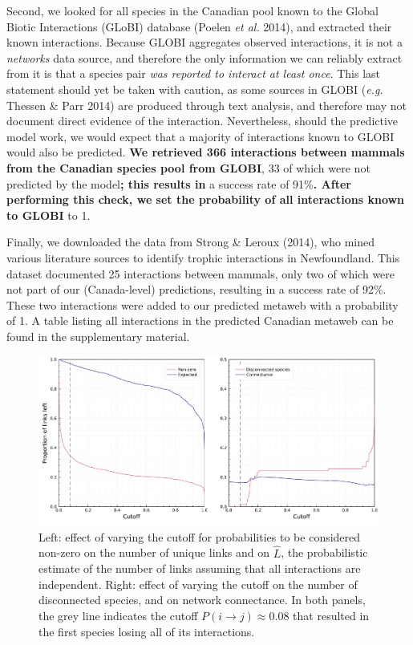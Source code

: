 \documentclass[11pt]{article}
\makeatletter
\def\maxwidth{\ifdim\Gin@nat@width>\linewidth\linewidth
\else\Gin@nat@width\fi}
\let\Oldincludegraphics\includegraphics
\renewcommand{\includegraphics}[1]{\Oldincludegraphics[width=\maxwidth]{#1}}
\providecommand{\DIFaddtex}[1]{{\bf #1}} %
\providecommand{\DIFdeltex}[1]{} %
\providecommand{\DIFaddbegin}{\protect\color{blue}} %
\providecommand{\DIFaddend}{\protect\color{black}} %
\providecommand{\DIFdelbegin}{\protect\color{red}} %
\providecommand{\DIFdelend}{\protect\color{black}} %
\providecommand{\DIFadd}[1]{\texorpdfstring{\DIFaddtex{#1}}{#1}} %
\providecommand{\DIFdel}[1]{\texorpdfstring{\DIFdeltex{#1}}{}} %
\newcommand{\DIFscaledelfig}{0.5}
\newlength{\DIFdelgraphicswidth} %
\newlength{\DIFdelgraphicsheight} %
\newcommand{\DIFaddincludegraphics}[2][]{{\color{blue}\fbox{\DIFOincludegraphics[#1]{#2}}}} %
\newcommand{\DIFdelincludegraphics}[2][]{%
\sbox{\DIFdelgraphicsbox}{\DIFOincludegraphics[#1]{#2}}%
\settoboxwidth{\DIFdelgraphicswidth}{\DIFdelgraphicsbox} %
\settoboxtotalheight{\DIFdelgraphicsheight}{\DIFdelgraphicsbox} %
\scalebox{\DIFscaledelfig}{%
\parbox[b]{\DIFdelgraphicswidth}{\usebox{\DIFdelgraphicsbox}\\[-\baselineskip] \rule{\DIFdelgraphicswidth}{0em}}\llap{\resizebox{\DIFdelgraphicswidth}{\DIFdelgraphicsheight}{%
\setlength{\unitlength}{\DIFdelgraphicswidth}%
\begin{picture}(1,1)%
\thicklines\linethickness{2pt} %
{\color[rgb]{1,0,0}\put(0,0){\framebox(1,1){}}}%
{\color[rgb]{1,0,0}\put(0,0){\line( 1,1){1}}}%
{\color[rgb]{1,0,0}\put(0,1){\line(1,-1){1}}}%
\end{picture}%
}\hspace*{3pt}}} %
} %
\DeclareRobustCommand{\DIFaddbegin}{\DIFOaddbegin \let\includegraphics\DIFaddincludegraphics} %
\DeclareRobustCommand{\DIFaddend}{\DIFOaddend \let\includegraphics\DIFOincludegraphics} %
\DeclareRobustCommand{\DIFdelbegin}{\DIFOdelbegin \let\includegraphics\DIFdelincludegraphics} %
\DeclareRobustCommand{\DIFdelend}{\DIFOaddend \let\includegraphics\DIFOincludegraphics} %
\makeatother
\begin{document}
Second, we looked for all species in the Canadian pool known to the
Global Biotic Interactions (GLoBI) database (Poelen \emph{et al.} 2014),
and extracted their known interactions. Because GLOBI aggregates
observed interactions, it is not a \emph{networks} data source, and
therefore the only information we can reliably extract from it is that a
species pair \emph{was reported to interact at least once}. This last
statement should yet be taken with caution, as some sources in GLOBI
(\emph{e.g.} Thessen \& Parr 2014) are produced through text analysis,
and therefore may not document direct evidence of the interaction.
Nevertheless, should the predictive model work, we would expect that a
majority of interactions known to GLOBI would also be predicted. \DIFdelbegin \DIFdel{After
performing this check, we set the probability of all interactions known
to GLOBI(366 in total}\DIFdelend \DIFaddbegin \DIFadd{We
retrieved 366 interactions between mammals from the Canadian species
pool from GLOBI}\DIFaddend , 33 of which were not predicted by the model\DIFdelbegin \DIFdel{, for
}\DIFdelend \DIFaddbegin \DIFadd{; this
results in }\DIFaddend a success rate of 91\%\DIFdelbegin \DIFdel{) }\DIFdelend \DIFaddbegin \DIFadd{. After performing this check, we set
the probability of all interactions known to GLOBI }\DIFaddend to 1.

Finally, we downloaded the data from Strong \& Leroux (2014), who mined
various literature sources to identify trophic interactions in
Newfoundland. This dataset documented 25 interactions between mammals,
only two of which were not part of our (Canada-level) predictions,
resulting in a success rate of 92\%. These two interactions were added
to our predicted metaweb with a probability of 1. A table listing all
interactions in the predicted Canadian metaweb can be found in the
supplementary material.

\begin{figure}
\hypertarget{fig:thresholds}{%
\centering
\includegraphics{figures/figure-cutoffs.png}
\caption{Left: effect of varying the cutoff for probabilities to be
considered non-zero on the number of unique links and on \(\hat{L}\),
the probabilistic estimate of the number of links assuming that all
interactions are independent. Right: effect of varying the cutoff on the
number of disconnected species, and on network connectance. In both
panels, the grey line indicates the cutoff
\(P(i\rightarrow j) \approx 0.08\) that resulted in the first species
losing all of its interactions.}\label{fig:thresholds}
}

\end{figure}
\end{document}
